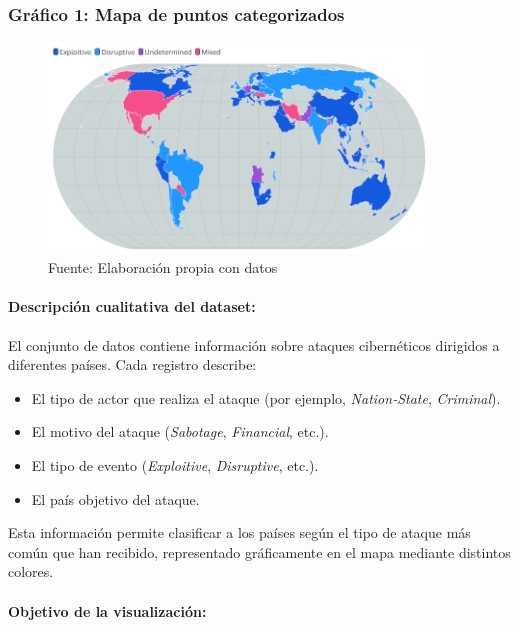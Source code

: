 \documentclass[12pt, a4paper]{article}
\begin{document}
\subsubsection*{Gráfico 1: Mapa de puntos categorizados}
\begin{figure}[H]
    \centering
    \includegraphics[width=0.9\textwidth]{images/punto_cate.png}
    \caption{Fuente: Elaboración propia con datos}
\end{figure}

\paragraph{Descripción cualitativa del dataset:}

El conjunto de datos contiene información sobre ataques cibernéticos dirigidos a diferentes países. Cada registro describe:
\begin{itemize}
    \item El tipo de actor que realiza el ataque (por ejemplo, \textit{Nation-State}, \textit{Criminal}).
    \item El motivo del ataque (\textit{Sabotage}, \textit{Financial}, etc.).
    \item El tipo de evento (\textit{Exploitive}, \textit{Disruptive}, etc.).
    \item El país objetivo del ataque.
\end{itemize}
Esta información permite clasificar a los países según el tipo de ataque más común que han recibido, representado gráficamente en el mapa mediante distintos colores.

\paragraph{Objetivo de la visualización:}
\end{document}
